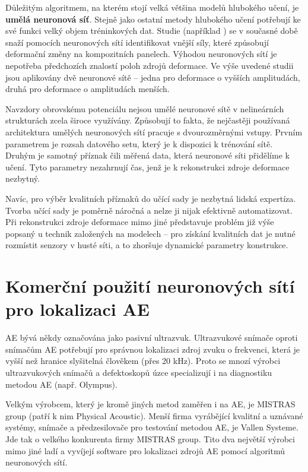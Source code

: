 Důležitým algoritmem, na kterém stojí velká většina modelů hlubokého učení, je \textbf{umělá neuronová síť}. Stejně jako ostatní metody hlubokého učení potřebují ke své funkci velký objem tréninkových dat. Studie (například \cite{ghajari}) se v současné době snaží pomocích neuronových sítí identifikovat vnější síly, které způsobují deformační změny na kompozitních panelech. Výhodou neuronových sítí je nepotřeba předchozích znalostí poloh zdrojů deformace. Ve výše uvedené studii jsou aplikovány dvě neuronové sítě – jedna pro deformace o vyšších amplitudách, druhá pro deformace o amplitudách menších.

Navzdory obrovskému potenciálu nejsou umělé neuronové sítě v nelineárních strukturách zcela široce využívány. Způsobují to fakta, že nejčastěji používaná architektura umělých neuronových sítí pracuje s dvourozměrnými vstupy. Prvním parametrem je rozsah datového setu, který je k dispozici k trénování sítě. Druhým je samotný příznak čili měřená data, která neuronové síti přidělíme k učení. Tyto parametry nezahrnují čas, jenž je k rekonstrukci zdroje deformace nezbytný.

Navíc, pro výběr kvalitních příznaků do učící sady je nezbytná lidská expertíza. Tvorba učící sady je poměrně náročná a nelze ji nijak efektivně automatizovat. Při rekonstrukci zdroje deformace mimo jiné představuje problém již výše popsaný u technik založených na modelech – pro získání kvalitních dat je nutné rozmístit senzory v husté síti, a to zhoršuje dynamické parametry konstrukce.

\section{Komerční použití neuronových sítí pro lokalizaci AE}
AE bývá někdy označována jako pasivní ultrazvuk. Ultrazvukové snímače oproti snímačům AE potřebují pro správnou lokalizaci zdroj zvuku o frekvenci, která je vyšší než hranice slyšitelná člověkem (přes 20 kHz). Proto se mnozí výrobci ultrazvukových snímačů a defektoskopů úzce specializují i na diagnostiku metodou AE (např. Olympus). 

Velkým výrobcem, který je kromě jiných metod zaměřen i na AE, je MISTRAS group (patří k nim Physical Acoustic). Menší firma vyrábějící kvalitní a uznávané systémy, snímače a předzesilovače pro testování metodou AE, je Vallen Systeme. Jde tak o velkého konkurenta firmy MISTRAS group. Tito dva největší výrobci mimo jiné ladí a vyvíjejí software pro lokalizaci zdrojů AE pomocí algoritmů neuronových sítí.

